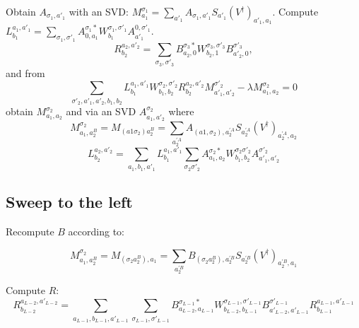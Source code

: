 \documentclass[showpacs,preprintnumbers,amsmath,amssymb,superscriptaddress,showkeys,pre]{revtex4}
\begin{document}
Obtain $A_{\sigma_1,a'_1}$ with an SVD: $M^{\sigma_1}_{a_1} = \sum_{a'_1} A_{\sigma_1,a'_1} S_{a'_1} (V^\dagger)_{a'_1,a_1}$.
Compute $L^{a_1,a'_1}_{b_1} = \sum_{\sigma_1,\sigma'_1} A^{\sigma_1 *}_{0,a_1} W^{\sigma_1,\sigma'_1}_{b_1} A^{0,\sigma'_1}_{a'_1}$.
\begin{equation}
R_{b_2}^{a_2,a'_2} =  \sum_{\sigma_3,\sigma'_3} B^{\sigma_3 *}_{a_2,0}
W^{\sigma_3,\sigma'_3}_{b_2,1} B^{\sigma'_3}_{a'_2,0},
\end{equation}
and from
\begin{equation}
\sum_{\sigma'_2,a'_1,a'_2,b_1,b_2} L^{a_1,a'_1}_{b_1} W^{\sigma_2,\sigma'_2}_{b_1,b_2} R_{b_2}^{a_2,a'_2} M^{\sigma'_2}_{a'_1,a'_2}
- \lambda M^{\sigma_2}_{a_1,a_2}=0
\end{equation}
obtain $M^{\sigma_2}_{a_1,a_2}$ and via an SVD $A^{\sigma_2}_{a_1,a'_2}$ where
 \begin{equation}
M^{\sigma_2}_{a_1,a^B_2}=M_{(a1\sigma_2)a^B_2}=\sum_{a^{'A}_2} A_{(a1,\sigma_2),a^{'A}_2} S_{a^{'A}_2}(V^\dagger)_{a^{'A}_2,a_2}
\end{equation}
\begin{equation}
L^{a_2,a'_2}_{b_2} = \sum_{a_1,b_1,a'_1} L^{a_1,a'_1}_{b_1} \sum_{\sigma_2\sigma'_2} A^{\sigma_2 *}_{a_1,a_2}
W^{\sigma_2\sigma'_2}_{b_1,b_2}A^{\sigma'_2}_{a'_1,a'_2}
\end{equation}

\subsection{Sweep to the left}

Recompute $B$ according to:

 \begin{equation}
M^{\sigma_2}_{a_1,a^B_2}=M_{(\sigma_2a^B_2),a_1}=\sum_{a^{'B}_2} B_{(\sigma_2a^B_2),a^{'B}_2} S_{a^{'B}_2}(V^\dagger)_{a^{'B}_2,a_1}
\end{equation}

Compute $R$:
\begin{equation}
R^{a_{L-2},a'_{L-2}}_{b_{L-2}} = \sum_{a_{L-1},b_{L-1},a'_{L-1}}\sum_{\sigma_{L-1},\sigma'_{L-1}} B^{\sigma_{L-1}*}_{a_{L-2},a_{L-1}}
W^{\sigma_{L-1},\sigma'_{L-1}}_{b_{L-2},b_{L-1}} B^{\sigma'_{L-1}}_{a'_{L-2},a'_{L-1}} R^{a_{L-1},a'_{L-1}}_{b_{L-1}}
\end{equation}
\end{document}
